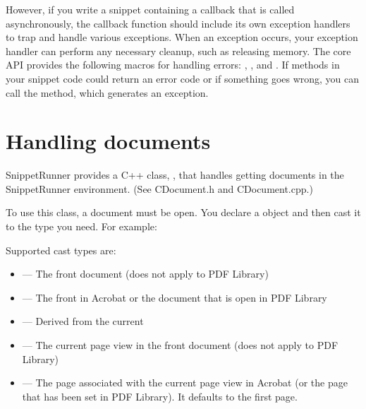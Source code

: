\documentclass[letterpaper,12pt,english,openany,oneside]{sphinxmanual}
\begin{document}
However, if you write a snippet containing a callback that is called asynchronously, the callback function should include its own exception handlers to trap and handle various exceptions. When an exception occurs, your exception handler can perform any necessary cleanup, such as releasing memory. The core API provides the following macros for handling errors:  ,  ,  and  . If methods in your snippet code could return an error code or  if something goes wrong, you can call the  method, which generates an exception.


\section{Handling documents}
\label{\detokenize{Snippet_WritingSnippets:handling-documents}}
SnippetRunner provides a C++ class,  , that handles getting documents in the SnippetRunner environment. (See CDocument.h and CDocument.cpp.)

To use this class, a document must be open. You declare a  object and then cast it to the type you need. For example:

\begin{sphinxVerbatim}[commandchars=\\\{\}]
 
\end{sphinxVerbatim}

Supported cast types are:
\begin{itemize}
\item {} 
 — The front document (does not apply to PDF Library)

\item {} 
 — The front  in Acrobat or the document that is open in PDF Library

\item {} 
 — Derived from the current 

\item {} 
 — The current page view in the front document (does not apply to PDF Library)

\item {} 
 — The page associated with the current page view in Acrobat (or the page that has been set in PDF Library). It defaults to the first page.

\end{itemize}
\end{document}
